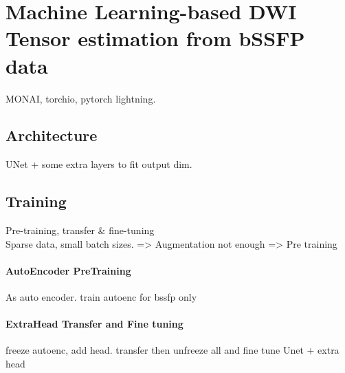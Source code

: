 \section{Machine Learning-based DWI Tensor estimation from bSSFP data}
MONAI, torchio, pytorch lightning. 

\subsection{Architecture}
UNet + some extra layers to fit output dim.

\subsection{Training}
Pre-training, transfer \& fine-tuning \\

Sparse data, small batch sizes. => Augmentation not enough => Pre training
\paragraph{AutoEncoder PreTraining}
As auto encoder. train autoenc for bssfp only 

\paragraph{ExtraHead Transfer and Fine tuning}
freeze autoenc, add head. transfer then unfreeze all and fine tune
Unet + extra head
